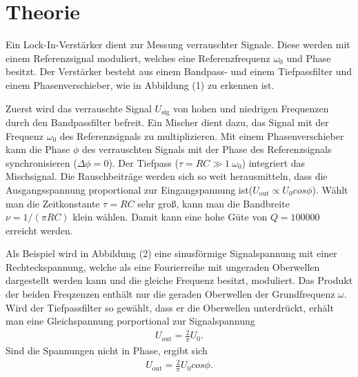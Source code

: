 \section{Theorie}
\label{sec:Theorie}

Ein Lock-In-Verstärker dient zur Messung verrauschter Signale. 
Diese werden mit einem Referenzsignal moduliert, welches eine Referenzfrequenz $\omega_0$ und Phase besitzt.
Der Verstärker besteht aus einem Bandpass- und einem Tiefpassfilter und einem Phasenverschieber, wie in Abbildung (1) zu erkennen ist.

\noindent Zuerst wird das verrauschte Signal $U_\text{sig}$ von hohen und niedrigen Frequenzen durch den Bandpassfilter befreit.
Ein Mischer dient dazu, das Signal mit der Frequenz $\omega_0$ des Referenzsignals zu multiplizieren.
Mit einem Phasenverschieber kann die Phase $\phi$ des verrauschten Signals mit der Phase des Referenzsignals synchronisieren ($\Delta \phi = 0$).
Der Tiefpass ($\tau = RC \gg 1\ \omega_0 $) integriert das Mischsignal.
Die Rauschbeiträge werden sich so weit herausmitteln, dass die Ausgangsspannung proportional zur Eingangspannung ist($U_\text{out} \propto U_0 cos\phi $).
Wählt man die Zeitkonstante $\tau = RC$ sehr groß, kann man die Bandbreite $\nu = 1/(\pi RC)$ klein wählen.
Damit kann eine hohe Güte von $Q = 100000$ erreicht werden.

\noindent Als Beispiel wird in Abbildung (2) eine sinusförmige Signalspannung mit einer Rechteckspannung, welche als eine Fourierreihe mit ungeraden Oberwellen dargestellt werden kann und die gleiche Frequenz besitzt, moduliert.
Das Produkt der beiden Freqzenzen enthält nur die geraden Oberwellen der Grundfrequenz $\omega$. 
Wird der Tiefpassfilter so gewählt, dass er die Oberwellen unterdrückt, erhält man eine Gleichspannung porportional zur Signalspannung
\begin{align}
U_\text{out} = \frac{2}{\pi} U_0 .
\end{align}
Sind die Spannungen nicht in Phase, ergibt sich
\begin{align}
U_\text{out} = \frac{2}{\pi} U_0 cos \phi .
\end{align}
